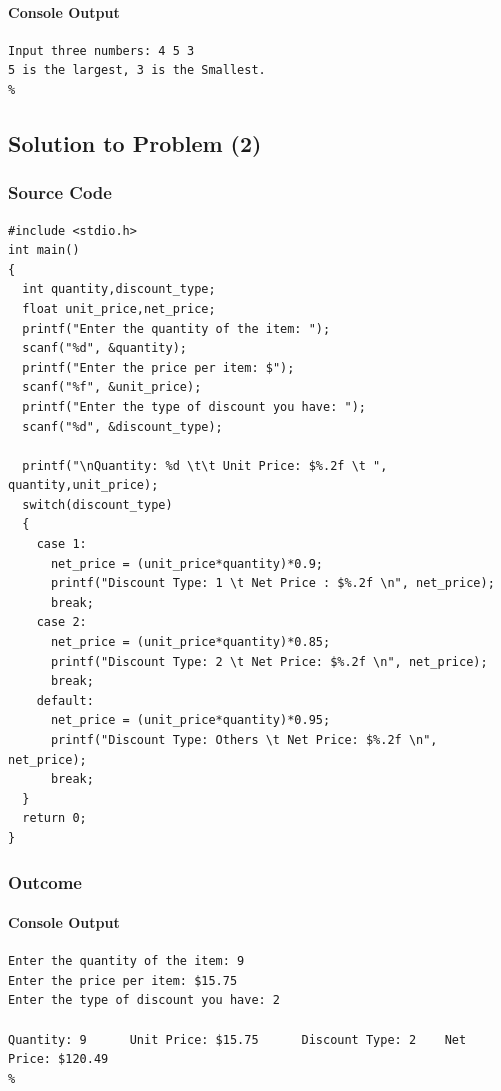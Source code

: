 \documentclass[a4paper,11pt]{article}
\theoremstyle{mytheor}
\theoremstyle{mytheor}
\begin{document}
\paragraph{Console Output}
\begin{lstlisting}[escapechar=\%,style=output,numbers=none,label={list:second},title=Program's output to console in plaintext -- using inputs from test sample]
Input three numbers: 4 5 3
5 is the largest, 3 is the Smallest.
%
\end{lstlisting}
\newpage
\subsection{Solution to Problem (2)}
\subsubsection{Source Code}
\begin{lstlisting}[label={list:third},title=Program's \texttt{\color{inlinecode}{main.c}} File -- console input/output-oriented application to solve the problem]
#include <stdio.h>
int main()
{
  int quantity,discount_type;
  float unit_price,net_price;
  printf("Enter the quantity of the item: ");
  scanf("%d", &quantity);
  printf("Enter the price per item: $");
  scanf("%f", &unit_price);
  printf("Enter the type of discount you have: ");
  scanf("%d", &discount_type);
  
  printf("\nQuantity: %d \t\t Unit Price: $%.2f \t ", quantity,unit_price);
  switch(discount_type)
  {
    case 1:
      net_price = (unit_price*quantity)*0.9;
      printf("Discount Type: 1 \t Net Price : $%.2f \n", net_price);
      break;
    case 2:
      net_price = (unit_price*quantity)*0.85;
      printf("Discount Type: 2 \t Net Price: $%.2f \n", net_price);
      break;
    default:
      net_price = (unit_price*quantity)*0.95;
      printf("Discount Type: Others \t Net Price: $%.2f \n", net_price);
      break;
  }
  return 0;
}
\end{lstlisting}
\subsubsection{Outcome}
\paragraph{Console Output}
\begin{lstlisting}[escapechar=\%,style=output,numbers=none,label={list:fourth},title=Program's output to console in plaintext -- using inputs from test sample (2) in following page]
Enter the quantity of the item: 9 
Enter the price per item: $15.75
Enter the type of discount you have: 2

Quantity: 9 	 Unit Price: $15.75 	 Discount Type: 2 	 Net Price: $120.49
%
\end{lstlisting}
\newpage
\end{document}

